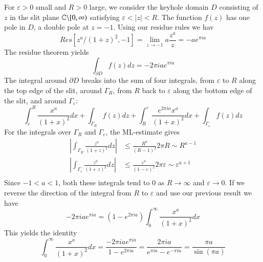For $\varepsilon > 0$ small and $R > 0$ large, we consider the keyhole domain $D$ consisting of $z$ in the slit plane $\mathbb C\backslash[0,\infty)$ satisfying $\varepsilon < |z| < R$. The function $f(z)$ has one pole in $D$, a double pole at $z = -1$. Using our residue rules we hav \begin{equation*}
    Res[z^a/(1+z)^2,-1] = \lim\limits_{z\rightarrow -1}a\frac{z^a}{z} = -ae^{\pi ia}
\end{equation*}
The residue theorem yields \begin{equation*}
    \int_{\partial D}f(z)dz = -2\pi iae^{\pi ia}
\end{equation*}
The integral around $\partial D$ breaks into the sum of four integrals, from $\varepsilon$ to $R$ along the top edge of the slit, around $\Gamma_R$, from $R$ back to $\varepsilon$ along the bottom edge of the slit, and around $\Gamma_{\varepsilon}$: \begin{equation*}
    \int_{\varepsilon}^R\frac{x^a}{(1+x)^2}dx + \int_{\Gamma_R}f(z)dz+\int_R^{\varepsilon}\frac{e^{2\pi ia}x^a}{(1+x)^2}dx+\int_{\Gamma_{\varepsilon}}f(z)dz
\end{equation*}
For the integrals over $\Gamma_R$ and $\Gamma_{\varepsilon}$, the ML-estimate gives \begin{align*}
    \left|\int_{\Gamma_R}\frac{z^a}{(1+z)^2}dz\right| &\leq \frac{R^a}{(R-1)^2}2\pi R\sim R^{a-1} \\
    \left|\int_{\Gamma_{\varepsilon}}\frac{z^a}{(1+z)^2}dz\right| &\leq \frac{\varepsilon^a}{(1-\varepsilon)^2}2\pi \varepsilon\sim \varepsilon^{a+1} \\
\end{align*}
Since $-1 < a < 1$, both these integrals tend to $0$ as $R\rightarrow \infty$ and $\varepsilon \rightarrow 0$. If we reverse the direction of the integral from $R$ to $\varepsilon$ and use our previous result we have \begin{equation*}
    -2\pi iae^{\pi ia} = (1-e^{2\pi ia})\int_{0}^{\infty}\frac{x^a}{(1+x)^2}dx
\end{equation*}
This yields the identity \begin{equation*}
    \int_0^{\infty}\frac{x^a}{(1+x)^2}dx = \frac{-2\pi iae^{\pi ia}}{1-e^{2\pi ia}} = \frac{2\pi ia}{e^{\pi ia}-e^{-\pi ia}} = \frac{\pi a}{\sin(\pi a)}
\end{equation*}


